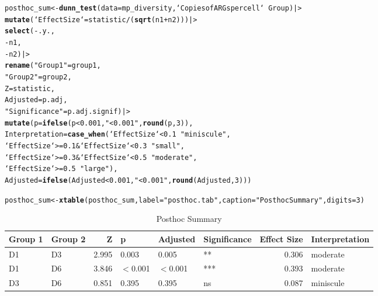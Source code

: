 \documentclass{article}\usepackage[]{graphicx}\usepackage[]{xcolor}
\makeatletter
\newcommand{\hlnum}[1]{\textcolor[rgb]{0.686,0.059,0.569}{#1}}%
\newcommand{\hlsng}[1]{\textcolor[rgb]{0.192,0.494,0.8}{#1}}%
\newcommand{\hlopt}[1]{\textcolor[rgb]{0,0,0}{#1}}%
\newcommand{\hldef}[1]{\textcolor[rgb]{0.345,0.345,0.345}{#1}}%
\newcommand{\hlkwb}[1]{\textcolor[rgb]{0.69,0.353,0.396}{#1}}%
\newcommand{\hlkwc}[1]{\textcolor[rgb]{0.333,0.667,0.333}{#1}}%
\newcommand{\hlkwd}[1]{\textcolor[rgb]{0.737,0.353,0.396}{\textbf{#1}}}%
\newenvironment{kframe}{%
 \def\at@end@of@kframe{}%
 \ifinner\ifhmode%
  \def\at@end@of@kframe{\end{minipage}}%
  \begin{minipage}{\columnwidth}%
 \fi\fi%
 \def\FrameCommand##1{\hskip\@totalleftmargin \hskip-\fboxsep
 \colorbox{shadecolor}{##1}\hskip-\fboxsep
     \hskip-\linewidth \hskip-\@totalleftmargin \hskip\columnwidth}%
 \MakeFramed {\advance\hsize-\width
   \@totalleftmargin\z@ \linewidth\hsize
   \@setminipage}}%
 {\par\unskip\endMakeFramed%
 \at@end@of@kframe}
\newenvironment{knitrout}{}{} %
\makeatother
\begin{document}
\begin{enumerate}
\begin{enumerate}
\begin{knitrout}
\begin{kframe}
\begin{alltt}
\hldef{posthoc_sum} \hlkwb{<-} \hlkwd{dunn_test}\hldef{(}\hlkwc{data} \hldef{= mp_diversity, `Copies of ARGs per cell`} \hlopt{~} \hldef{Group) |>}
  \hlkwd{mutate}\hldef{(}\hlkwc{`Effect Size`} \hldef{= statistic} \hlopt{/} \hldef{(}\hlkwd{sqrt}\hldef{(n1}\hlopt{+}\hldef{n2))) |>}
  \hlkwd{select}\hldef{(}\hlopt{-}\hldef{.y.,}
         \hlopt{-}\hldef{n1,}
         \hlopt{-}\hldef{n2) |>}
  \hlkwd{rename}\hldef{(}\hlsng{"Group 1"} \hldef{= group1,}
         \hlsng{"Group 2"} \hldef{= group2,}
         \hlkwc{Z} \hldef{= statistic,}
         \hlkwc{Adjusted} \hldef{= p.adj,}
         \hlsng{"Significance"} \hldef{= p.adj.signif) |>}
  \hlkwd{mutate}\hldef{(}\hlkwc{p} \hldef{=} \hlkwd{ifelse}\hldef{(p} \hlopt{<} \hlnum{0.001}\hldef{,} \hlsng{"<0.001"}\hldef{,} \hlkwd{round}\hldef{(p,} \hlnum{3}\hldef{)) ,}
         \hlkwc{Interpretation} \hldef{=} \hlkwd{case_when}\hldef{(`Effect Size`} \hlopt{<} \hlnum{0.1} \hlopt{~} \hlsng{"miniscule"}\hldef{,}
                                    \hldef{`Effect Size`} \hlopt{>=} \hlnum{0.1} \hlopt{&} \hldef{`Effect Size`} \hlopt{<} \hlnum{0.3} \hlopt{~} \hlsng{"small"}\hldef{,}
                                    \hldef{`Effect Size`} \hlopt{>=} \hlnum{0.3} \hlopt{&} \hldef{`Effect Size`} \hlopt{<} \hlnum{0.5} \hlopt{~} \hlsng{"moderate"}\hldef{,}
                                    \hldef{`Effect Size`} \hlopt{>=} \hlnum{0.5} \hlopt{~} \hlsng{"large"}\hldef{),}
         \hlkwc{Adjusted} \hldef{=} \hlkwd{ifelse}\hldef{(Adjusted} \hlopt{<} \hlnum{0.001}\hldef{,} \hlsng{"<0.001"}\hldef{,} \hlkwd{round}\hldef{(Adjusted,} \hlnum{3}\hldef{)))}


\hldef{posthoc_sum} \hlkwb{<-} \hlkwd{xtable}\hldef{(posthoc_sum,}\hlkwc{label} \hldef{=} \hlsng{"posthoc.tab"}\hldef{,} \hlkwc{caption} \hldef{=} \hlsng{"Posthoc Summary"}\hldef{,} \hlkwc{digits} \hldef{=} \hlnum{3}\hldef{)}
\end{alltt}
\end{kframe}
\end{knitrout}


\begin{table}[H]
\centering
\begingroup\small
\begin{tabular}{llrlllrl}
  \hline
Group 1 & Group 2 & Z & p & Adjusted & Significance & Effect Size & Interpretation \\ 
  \hline
D1 & D3 & 2.995 & 0.003 & 0.005 & ** & 0.306 & moderate \\ 
  D1 & D6 & 3.846 & $<$0.001 & $<$0.001 & *** & 0.393 & moderate \\ 
  D3 & D6 & 0.851 & 0.395 & 0.395 & ns & 0.087 & miniscule \\ 
   \hline
\end{tabular}
\endgroup
\caption{Posthoc Summary} 
\label{posthoc.tab}
\end{table}



\end{enumerate}
\end{enumerate}
\end{document}
